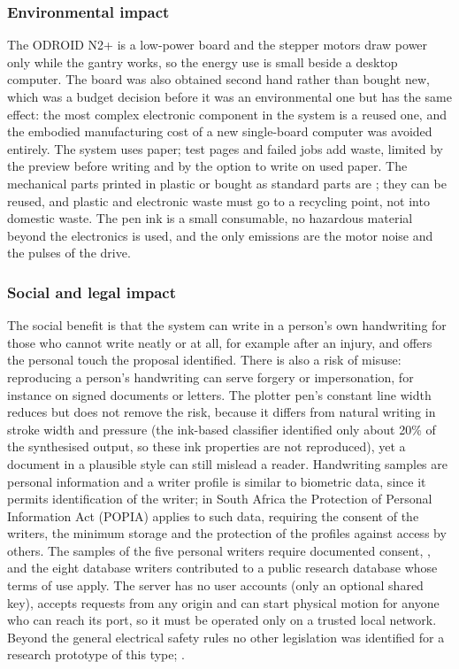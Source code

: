     \subsubsection{Environmental impact}

        The ODROID N2+ is a low-power board and the stepper motors draw power only while the gantry works, so the energy use is small beside a desktop computer.
        The board was also obtained second hand rather than bought new, which was a budget decision before it was an environmental one but has the same effect: the most complex electronic component in the system is a reused one, and the embodied manufacturing cost of a new single-board computer was avoided entirely.
        The system uses paper; test pages and failed jobs add waste, limited by the preview before writing and by the option to write on used paper.
        The mechanical parts printed in plastic or bought as standard parts are ; they can be reused, and plastic and electronic waste must go to a recycling point, not into domestic waste.
        The pen ink is a small consumable, no hazardous material beyond the electronics is used, and the only emissions are the motor noise and the pulses of the drive.

    \subsubsection{Social and legal impact}

        The social benefit is that the system can write in a person's own handwriting for those who cannot write neatly or at all, for example after an injury, and offers the personal touch the proposal identified.
        There is also a risk of misuse: reproducing a person's handwriting can serve forgery or impersonation, for instance on signed documents or letters.
        The plotter pen's constant line width reduces but does not remove the risk, because it differs from natural writing in stroke width and pressure (the ink-based classifier identified only about 20\% of the synthesised output, so these ink properties are not reproduced), yet a document in a plausible style can still mislead a reader.
        Handwriting samples are personal information and a writer profile is similar to biometric data, since it permits identification of the writer; in South Africa the Protection of Personal Information Act (POPIA) applies to such data, requiring the consent of the writers, the minimum storage and the protection of the profiles against access by others.
        The samples of the five personal writers require documented consent, , and the eight database writers contributed to a public research database whose terms of use apply.
        The server has no user accounts (only an optional shared key), accepts requests from any origin and can start physical motion for anyone who can reach its port, so it must be operated only on a trusted local network.
        Beyond the general electrical safety rules no other legislation was identified for a research prototype of this type; .

